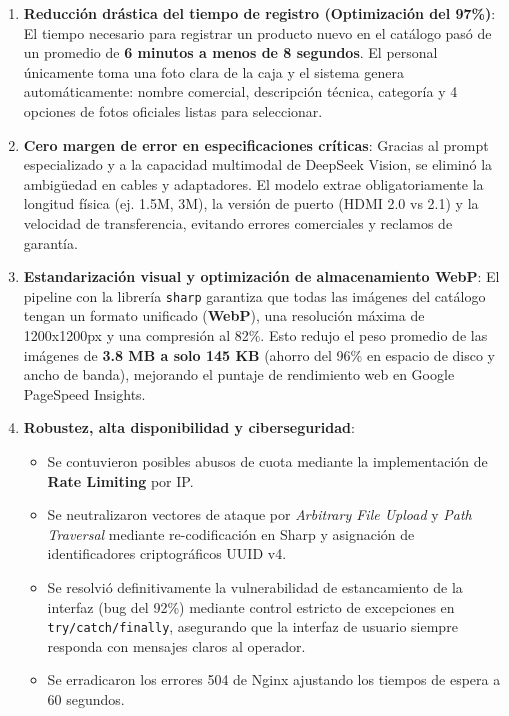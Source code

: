 \documentclass[11pt,a4paper]{article}
\begin{document}
\begin{enumerate}
    \item \textbf{Reducción drástica del tiempo de registro (Optimización del 97\%)}:
    El tiempo necesario para registrar un producto nuevo en el catálogo pasó de un promedio de \textbf{6 minutos a menos de 8 segundos}. El personal únicamente toma una foto clara de la caja y el sistema genera automáticamente: nombre comercial, descripción técnica, categoría y 4 opciones de fotos oficiales listas para seleccionar.

    \item \textbf{Cero margen de error en especificaciones críticas}:
    Gracias al prompt especializado y a la capacidad multimodal de DeepSeek Vision, se eliminó la ambigüedad en cables y adaptadores. El modelo extrae obligatoriamente la longitud física (ej. 1.5M, 3M), la versión de puerto (HDMI 2.0 vs 2.1) y la velocidad de transferencia, evitando errores comerciales y reclamos de garantía.

    \item \textbf{Estandarización visual y optimización de almacenamiento WebP}:
    El pipeline con la librería \texttt{sharp} garantiza que todas las imágenes del catálogo tengan un formato unificado (\textbf{WebP}), una resolución máxima de 1200x1200px y una compresión al 82\%. Esto redujo el peso promedio de las imágenes de \textbf{3.8 MB a solo 145 KB} (ahorro del 96\% en espacio de disco y ancho de banda), mejorando el puntaje de rendimiento web en Google PageSpeed Insights.

    \item \textbf{Robustez, alta disponibilidad y ciberseguridad}:
    \begin{itemize}
        \item Se contuvieron posibles abusos de cuota mediante la implementación de \textbf{Rate Limiting} por IP.
        \item Se neutralizaron vectores de ataque por \textit{Arbitrary File Upload} y \textit{Path Traversal} mediante re-codificación en Sharp y asignación de identificadores criptográficos UUID v4.
        \item Se resolvió definitivamente la vulnerabilidad de estancamiento de la interfaz (bug del 92\%) mediante control estricto de excepciones en \texttt{try/catch/finally}, asegurando que la interfaz de usuario siempre responda con mensajes claros al operador.
        \item Se erradicaron los errores 504 de Nginx ajustando los tiempos de espera a 60 segundos.
    \end{itemize}
\end{enumerate}
\end{document}
